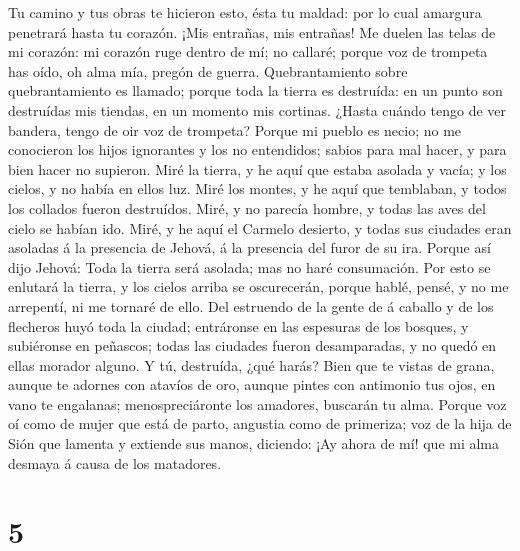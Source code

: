  Tu camino y tus obras te hicieron esto, ésta tu maldad:
por lo cual amargura penetrará hasta tu corazón.  ¡Mis
entrañas, mis entrañas! Me duelen las telas de mi corazón: mi corazón
ruge dentro de mí; no callaré; porque voz de trompeta has oído, oh alma
mía, pregón de guerra.  Quebrantamiento sobre
quebrantamiento es llamado; porque toda la tierra es destruída: en un
punto son destruídas mis tiendas, en un momento mis cortinas.
 ¿Hasta cuándo tengo de ver bandera, tengo de oir voz de
trompeta?  Porque mi pueblo es necio; no me conocieron
los hijos ignorantes y los no entendidos; sabios para mal hacer, y para
bien hacer no supieron.  Miré la tierra, y he aquí que
estaba asolada y vacía; y los cielos, y no había en ellos luz.
 Miré los montes, y he aquí que temblaban, y todos los
collados fueron destruídos.  Miré, y no parecía hombre, y
todas las aves del cielo se habían ido.  Miré, y he aquí
el Carmelo desierto, y todas sus ciudades eran asoladas á la presencia
de Jehová, á la presencia del furor de su ira.  Porque
así dijo Jehová: Toda la tierra será asolada; mas no haré consumación.
 Por esto se enlutará la tierra, y los cielos arriba se
oscurecerán, porque hablé, pensé, y no me arrepentí, ni me tornaré de
ello.  Del estruendo de la gente de á caballo y de los
flecheros huyó toda la ciudad; entráronse en las espesuras de los
bosques, y subiéronse en peñascos; todas las ciudades fueron
desamparadas, y no quedó en ellas morador alguno.  Y tú,
destruída, ¿qué harás? Bien que te vistas de grana, aunque te adornes
con atavíos de oro, aunque pintes con antimonio tus ojos, en vano te
engalanas; menospreciáronte los amadores, buscarán tu alma.
 Porque voz oí como de mujer que está de parto, angustia
como de primeriza; voz de la hija de Sión que lamenta y extiende sus
manos, diciendo: ¡Ay ahora de mí! que mi alma desmaya á causa de los
matadores.

\hypertarget{section-4}{%
\section{5}\label{section-4}}

